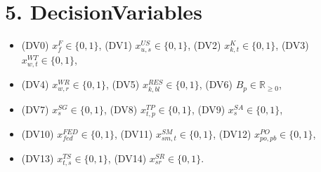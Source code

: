 \documentclass[11pt,a4paper]{article}
\begin{document}
\section{5. DecisionVariables}
\begin{itemize}
  \item (DV0) $x^{F}_{f}\in\{0,1\}$, (DV1) $x^{US}_{u,s}\in\{0,1\}$, (DV2) $x^{K}_{k,t}\in\{0,1\}$, (DV3) $x^{WT}_{w,t}\in\{0,1\}$,
  \item (DV4) $x^{WR}_{w,r}\in\{0,1\}$, (DV5) $x^{RES}_{k,bl}\in\{0,1\}$, (DV6) $B_p\in\mathbb{R}_{\ge 0}$,
  \item (DV7) $x^{SG}_{s}\in\{0,1\}$, (DV8) $x^{TP}_{t,p}\in\{0,1\}$, (DV9) $x^{SA}_{s}\in\{0,1\}$,
  \item (DV10) $x^{FED}_{fed}\in\{0,1\}$, (DV11) $x^{SM}_{sm,t}\in\{0,1\}$, (DV12) $x^{PO}_{po,pb}\in\{0,1\}$,
  \item (DV13) $x^{TS}_{t,s}\in\{0,1\}$, (DV14) $x^{SR}_{sr}\in\{0,1\}$.
\end{itemize}
\end{document}
